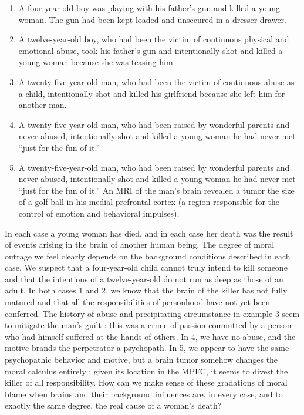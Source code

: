 \documentclass[a4paper,14pt]{extbook}
\begin{document}
\begin{enumerate}
      \item
            A four-year-old boy was playing with his father’s gun and killed a young woman.
            The gun had been kept loaded and unsecured in a dresser drawer.

      \item
            A twelve-year-old boy, who had been the victim of continuous physical and emotional abuse, took his father’s gun and intentionally shot and killed a young woman because she was teasing him.

      \item
            A twenty-five-year-old man, who had been the victim of continuous abuse as a child, intentionally shot and killed his girlfriend because she left him for another man.

      \item
            A twenty-five-year-old man, who had been raised by wonderful parents and never abused, intentionally shot and killed a young woman he had never met ``just for the fun of it.''

      \item
            A twenty-five-year-old man, who had been raised by wonderful parents and never abused, intentionally shot and killed a young woman he had never met ``just for the fun of it.''
            An MRI of the man’s brain revealed a tumor the size of a golf ball in his medial prefrontal cortex (a region responsible for the control of emotion and behavioral impulses).

\end{enumerate}

In each case a young woman has died, and in each case her death was the result of events arising in the brain of another human being.
The degree of moral outrage we feel clearly depends on the background conditions described in each case.
We suspect that a four-year-old child cannot truly intend to kill someone and that the intentions of a twelve-year-old do not run as deep as those of an adult.
In both cases 1 and 2, we know that the brain of the killer has not fully matured and that all the responsibilities of personhood have not yet been conferred.
The history of abuse and precipitating circumstance in example 3 seem to mitigate the man’s guilt :
this was a crime of passion committed by a person who had himself suffered at the hands of others.
In 4, we have no abuse, and the motive brands the perpetrator a psychopath.
In 5, we appear to have the same psychopathic behavior and motive, but a brain tumor somehow changes the moral calculus entirely :
given its location in the MPFC, it seems to divest the killer of all responsibility.
How can we make sense of these gradations of moral blame when brains and their background influences are, in every case, and to exactly the same degree, the real cause of a woman’s death?
\end{document}
